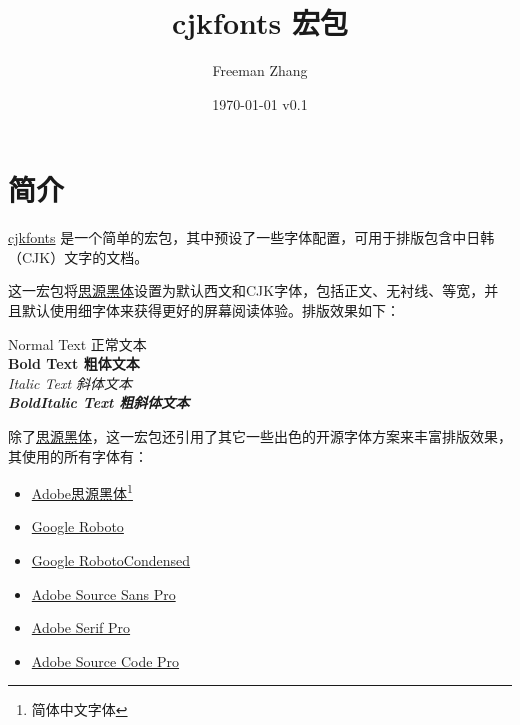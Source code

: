 \documentclass[oneside,final]{article}
\begin{document}
\title{cjkfonts 宏包}
\author{Freeman Zhang}
\date{\today{} v0.1}

\maketitle

\section{简介}

\href{https://github.com/zhanggyb/cjkfonts}{cjkfonts} 是一个简单的\XeLaTeX{}宏包，其中预设了一些字体配置，可用于排版包含中日韩（CJK）文字的文档。

这一宏包将\href{https://github.com/adobe-fonts/source-han-sans}{思源黑体}设置为默认西文和CJK字体，包括正文、无衬线、等宽，并且默认使用细字体来获得更好的屏幕阅读体验。排版效果如下：

\begin{center}
  Normal Text 正常文本 \\
  \vspace{1em}
  \textbf{Bold Text 粗体文本} \\
  \vspace{1em}
  \textit{Italic Text 斜体文本} \\
  \vspace{1em}
  \textbf{\textit{BoldItalic Text 粗斜体文本}}
\end{center}

除了\href{https://github.com/adobe-fonts/source-han-sans}{思源黑体}，这一宏包还引用了其它一些出色的开源字体方案来丰富排版效果，其使用的所有字体有：

\begin{itemize}
\item {\SourceHanSansSC \href{https://github.com/adobe-fonts/source-han-sans}{Adobe思源黑体}}\footnote{简体中文字体}
\item {\Roboto \href{https://github.com/google/roboto}{Google Roboto}}  
\item {\RobotoCondensed \href{https://github.com/google/roboto}{Google RobotoCondensed}}
\item {\SourceSansPro \href{https://github.com/adobe-fonts/source-sans-pro}{Adobe Source Sans Pro}}  
\item {\SourceSerifPro \href{https://github.com/adobe-fonts/source-serif-pro}{Adobe Serif Pro}}
\item {\SourceCodePro \href{https://github.com/adobe-fonts/source-code-pro}{Adobe Source Code Pro}}
\end{itemize}
\end{document}
